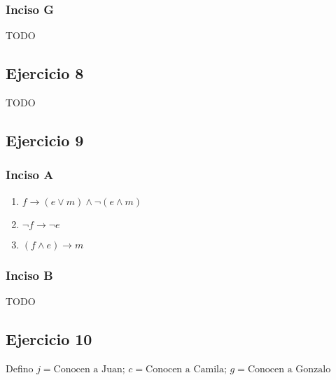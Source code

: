 \subsubsection{Inciso G}
TODO

\subsection{Ejercicio 8}
TODO

\subsection{Ejercicio 9}
\subsubsection{Inciso A}

\begin{enumerate}[label=(\alph*)]
    \item $f \rightarrow (e \vee m) \wedge \neg (e \wedge m)$
    \item $\neg f \rightarrow \neg e$
    \item $(f\wedge e) \rightarrow m$
\end{enumerate}

\subsubsection{Inciso B}
TODO

\subsection{Ejercicio 10}

Defino $j = \text{Conocen a Juan; } c = \text{Conocen a Camila; } g = \text{Conocen a Gonzalo}$ \\

